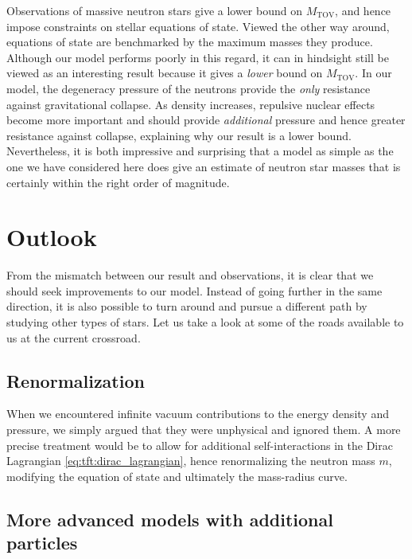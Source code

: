 Observations of massive neutron stars give a lower bound on $M_\text{TOV}$, and hence impose constraints on stellar equations of state.
Viewed the other way around, equations of state are benchmarked by the maximum masses they produce.
Although our model performs poorly in this regard, it can in hindsight still be viewed as an interesting result because it gives a \emph{lower} bound on $M_\text{TOV}$.
In our model, the degeneracy pressure of the neutrons provide the \emph{only} resistance against gravitational collapse.
As density increases, repulsive nuclear effects become more important and should provide \emph{additional} pressure and hence greater resistance against collapse, explaining why our result is a lower bound. \cite[section 3.9.8]{ref:glendenning}
Nevertheless, it is both impressive and surprising that a model as simple as the one we have considered here does give an estimate of neutron star masses that is certainly within the right order of magnitude.

\section{Outlook}

From the mismatch between our result and observations, it is clear that we should seek improvements to our model.
Instead of going further in the same direction, it is also possible to turn around and pursue a different path by studying other types of stars.
Let us take a look at some of the roads available to us at the current crossroad.

\subsection*{Renormalization}

When we encountered infinite vacuum contributions to the energy density and pressure, we simply argued that they were unphysical and ignored them.
A more precise treatment would be to allow for additional self-interactions in the Dirac Lagrangian \eqref{eq:tft:dirac_lagrangian}, hence renormalizing the neutron mass $m$, modifying the equation of state and ultimately the mass-radius curve.

\subsection*{More advanced models with additional particles}

